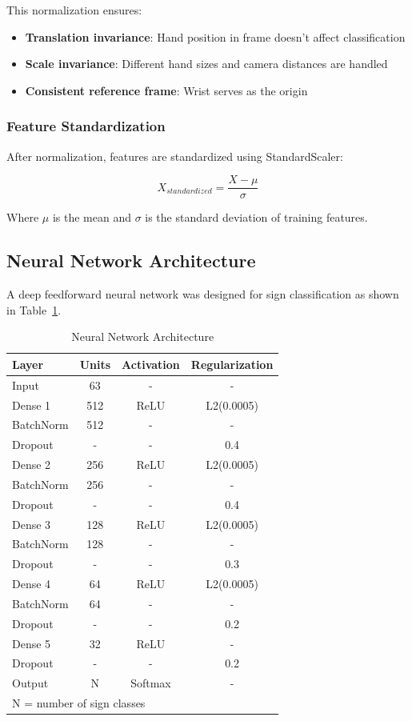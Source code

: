 \documentclass[conference]{IEEEtran}
\begin{document}
This normalization ensures:
\begin{itemize}
    \item \textbf{Translation invariance}: Hand position in frame doesn't affect classification
    \item \textbf{Scale invariance}: Different hand sizes and camera distances are handled
    \item \textbf{Consistent reference frame}: Wrist serves as the origin
\end{itemize}

\subsubsection{Feature Standardization}

After normalization, features are standardized using StandardScaler:

\begin{equation}
X_{standardized} = \frac{X - \mu}{\sigma}
\end{equation}

Where $\mu$ is the mean and $\sigma$ is the standard deviation of training features.

\subsection{Neural Network Architecture}

A deep feedforward neural network was designed for sign classification as shown in Table~\ref{tab:architecture}.

\begin{table}[htbp]
\caption{Neural Network Architecture}
\label{tab:architecture}
\centering
\begin{tabular}{|l|c|c|c|}
\hline
\textbf{Layer} & \textbf{Units} & \textbf{Activation} & \textbf{Regularization} \\
\hline
Input & 63 & - & - \\
Dense 1 & 512 & ReLU & L2(0.0005) \\
BatchNorm & 512 & - & - \\
Dropout & - & - & 0.4 \\
Dense 2 & 256 & ReLU & L2(0.0005) \\
BatchNorm & 256 & - & - \\
Dropout & - & - & 0.4 \\
Dense 3 & 128 & ReLU & L2(0.0005) \\
BatchNorm & 128 & - & - \\
Dropout & - & - & 0.3 \\
Dense 4 & 64 & ReLU & L2(0.0005) \\
BatchNorm & 64 & - & - \\
Dropout & - & - & 0.2 \\
Dense 5 & 32 & ReLU & - \\
Dropout & - & - & 0.2 \\
Output & N & Softmax & - \\
\hline
\multicolumn{4}{l}{\footnotesize N = number of sign classes} \\
\end{tabular}
\end{table}
\end{document}

